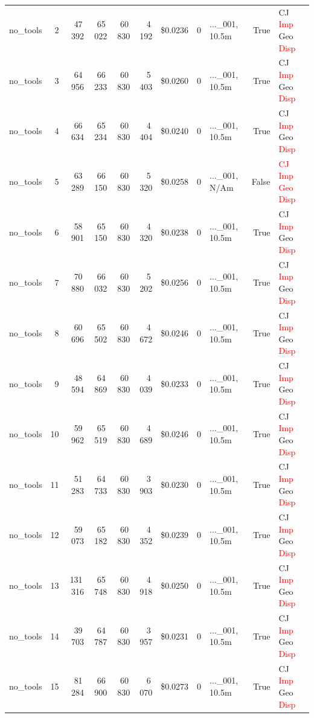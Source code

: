 \documentclass[a4paper,11pt]{article}
\begin{document}
\begin{table}[H]
{\begin{tabular}{l r r r r r r r l r l}
no\_tools & 2 & 47\,392 & 65\,022 & 60\,830 & 4\,192 & \$0.0236 & 0 & ...\_001, 10.5m & True & CJ \textcolor{red}{Imp} Geo \textcolor{red}{Disp} \\
no\_tools & 3 & 64\,956 & 66\,233 & 60\,830 & 5\,403 & \$0.0260 & 0 & ...\_001, 10.5m & True & CJ \textcolor{red}{Imp} Geo \textcolor{red}{Disp} \\
no\_tools & 4 & 66\,634 & 65\,234 & 60\,830 & 4\,404 & \$0.0240 & 0 & ...\_001, 10.5m & True & CJ \textcolor{red}{Imp} Geo \textcolor{red}{Disp} \\
no\_tools & 5 & 63\,289 & 66\,150 & 60\,830 & 5\,320 & \$0.0258 & 0 & ...\_001, N/Am & False & \textcolor{red}{CJ} \textcolor{red}{Imp} \textcolor{red}{Geo} \textcolor{red}{Disp} \\
no\_tools & 6 & 58\,901 & 65\,150 & 60\,830 & 4\,320 & \$0.0238 & 0 & ...\_001, 10.5m & True & CJ \textcolor{red}{Imp} Geo \textcolor{red}{Disp} \\
no\_tools & 7 & 70\,880 & 66\,032 & 60\,830 & 5\,202 & \$0.0256 & 0 & ...\_001, 10.5m & True & CJ \textcolor{red}{Imp} Geo \textcolor{red}{Disp} \\
no\_tools & 8 & 60\,696 & 65\,502 & 60\,830 & 4\,672 & \$0.0246 & 0 & ...\_001, 10.5m & True & CJ \textcolor{red}{Imp} Geo \textcolor{red}{Disp} \\
no\_tools & 9 & 48\,594 & 64\,869 & 60\,830 & 4\,039 & \$0.0233 & 0 & ...\_001, 10.5m & True & CJ \textcolor{red}{Imp} Geo \textcolor{red}{Disp} \\
no\_tools & 10 & 59\,962 & 65\,519 & 60\,830 & 4\,689 & \$0.0246 & 0 & ...\_001, 10.5m & True & CJ \textcolor{red}{Imp} Geo \textcolor{red}{Disp} \\
no\_tools & 11 & 51\,283 & 64\,733 & 60\,830 & 3\,903 & \$0.0230 & 0 & ...\_001, 10.5m & True & CJ \textcolor{red}{Imp} Geo \textcolor{red}{Disp} \\
no\_tools & 12 & 59\,073 & 65\,182 & 60\,830 & 4\,352 & \$0.0239 & 0 & ...\_001, 10.5m & True & CJ \textcolor{red}{Imp} Geo \textcolor{red}{Disp} \\
no\_tools & 13 & 131\,316 & 65\,748 & 60\,830 & 4\,918 & \$0.0250 & 0 & ...\_001, 10.5m & True & CJ \textcolor{red}{Imp} Geo \textcolor{red}{Disp} \\
no\_tools & 14 & 39\,703 & 64\,787 & 60\,830 & 3\,957 & \$0.0231 & 0 & ...\_001, 10.5m & True & CJ \textcolor{red}{Imp} Geo \textcolor{red}{Disp} \\
no\_tools & 15 & 81\,284 & 66\,900 & 60\,830 & 6\,070 & \$0.0273 & 0 & ...\_001, 10.5m & True & CJ \textcolor{red}{Imp} Geo \textcolor{red}{Disp} \\

\end{tabular}}
\end{table}
\end{document}
